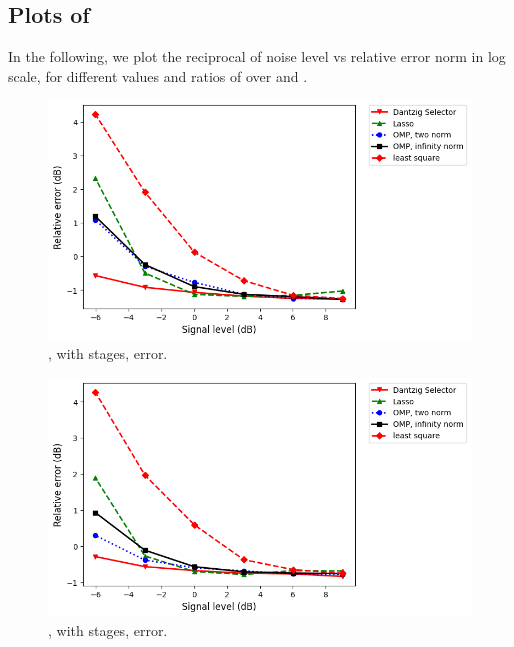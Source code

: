 \subsection {Plots of }

In the following, we plot the reciprocal of noise level vs relative error norm in log scale, for different values and ratios of  over  and .

\begin {figure} [H]
\includegraphics [width = \textwidth] {error-medium-square-two.png}
\caption {, with  stages, error.}
\end {figure}

\begin {figure} [H]
\includegraphics [width = \textwidth] {error-medium-tall-two.png}
\caption {, with  stages, error.}
\end {figure}

